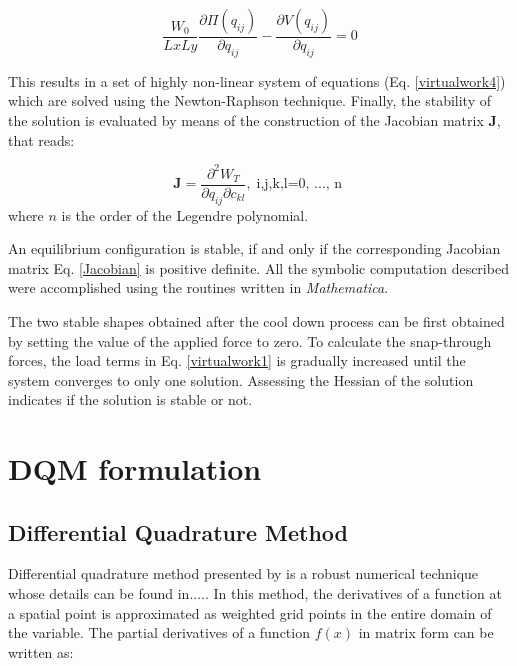 \documentclass[journal]{new-aiaa}
\begin{document}
\begin{equation}
\label{virtualwork5}
\frac{W_0}{LxLy}\frac{\partial \Pi(q_{ij})}{\partial q_{ij}} - \frac{\partial V(q_{ij})}{\partial q_{ij}}   =0 
\end{equation}

%

This results in a set of highly non-linear system of equations (Eq. \eqref{virtualwork4}) which are solved using the Newton-Raphson technique. Finally, the stability of the solution is evaluated by means of the construction of the Jacobian matrix $\textbf{J}$, that reads:

\begin{equation}
\label{Jacobian}
\textbf{J} = \frac{\partial^{2} W_{T} }{\partial q_{ij} \partial c_{kl}}, \;\text{i,j,k,l=0, ..., n }
\end{equation}
where $n$ is the order of the Legendre polynomial.

An equilibrium configuration is stable, if and only if the corresponding Jacobian matrix Eq. \eqref{Jacobian} is positive definite. All the symbolic computation described were accomplished using the routines written in \textsl{Mathematica}.

The two stable shapes obtained after the cool down process can be first obtained by setting the value of the applied force to zero. To calculate the snap-through forces, the load terms in Eq. \ref{virtualwork1} is gradually increased until the system converges to only one solution. Assessing the Hessian of the solution indicates if the solution is stable or not.


\section{DQM formulation}
\subsection{Differential Quadrature Method}
Differential quadrature method presented by \cite{Shu} is a robust numerical technique whose details can be found in.....
In this method, the derivatives of a function at a spatial point is approximated as  weighted grid points in the entire domain of the variable. The partial derivatives of a function $f(x)$ in matrix form can be written as:
\end{document}
